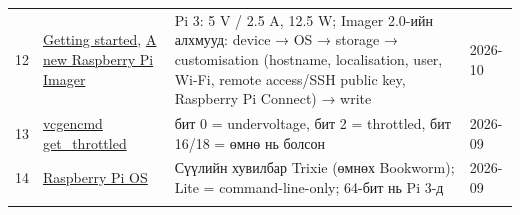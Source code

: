 \begin{longtable}[]{@{}llll@{}}
\begin{minipage}[t]{0.22\columnwidth}
12\strut
\end{minipage} & \begin{minipage}[t]{0.22\columnwidth}\raggedright
\href{https://www.raspberrypi.com/documentation/computers/getting-started.html}{Getting started}, \href{https://www.raspberrypi.com/news/a-new-raspberry-pi-imager/}{A new Raspberry Pi Imager}\strut
\end{minipage} & \begin{minipage}[t]{0.22\columnwidth}\raggedright
Pi 3: 5 V / 2.5 A, 12.5 W; Imager 2.0-ийн алхмууд: device → OS → storage → customisation (hostname, localisation, user, Wi-Fi, remote access/SSH public key, Raspberry Pi Connect) → write\strut
\end{minipage} & \begin{minipage}[t]{0.22\columnwidth}\raggedright
2026-10\strut
\end{minipage}\tabularnewline
\begin{minipage}[t]{0.22\columnwidth}\raggedright
13\strut
\end{minipage} & \begin{minipage}[t]{0.22\columnwidth}\raggedright
\href{https://www.raspberrypi.com/documentation/computers/os.html\#vcgencmd}{vcgencmd get\_\allowbreak{}throttled}\strut
\end{minipage} & \begin{minipage}[t]{0.22\columnwidth}\raggedright
бит 0 = undervoltage, бит 2 = throttled, бит 16/18 = өмнө нь болсон\strut
\end{minipage} & \begin{minipage}[t]{0.22\columnwidth}\raggedright
2026-09\strut
\end{minipage}\tabularnewline
\begin{minipage}[t]{0.22\columnwidth}\raggedright
14\strut
\end{minipage} & \begin{minipage}[t]{0.22\columnwidth}\raggedright
\href{https://www.raspberrypi.com/documentation/computers/os.html}{Raspberry Pi OS}\strut
\end{minipage} & \begin{minipage}[t]{0.22\columnwidth}\raggedright
Сүүлийн хувилбар Trixie (өмнөх Bookworm); Lite = command-line-only; 64-бит нь Pi 3-д\strut
\end{minipage} & \begin{minipage}[t]{0.22\columnwidth}\raggedright
2026-09\strut
\end{minipage}\tabularnewline
\begin{minipage}[t]{0.22\columnwidth}\raggedright

\end{minipage}
\end{longtable}

